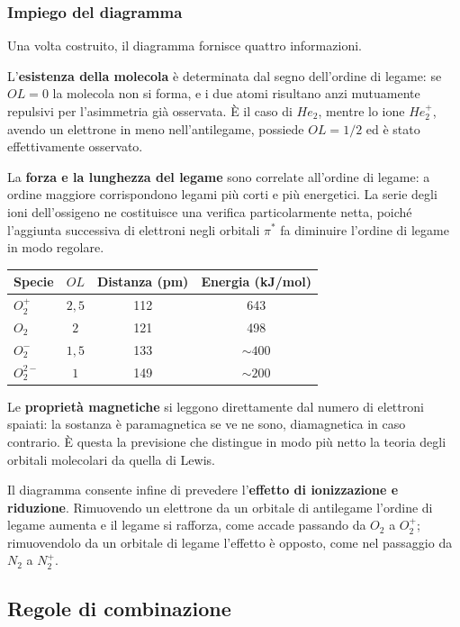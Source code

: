 \subsubsection*{Impiego del diagramma}

Una volta costruito, il diagramma fornisce quattro informazioni.

L'\textbf{esistenza della molecola} è determinata dal segno dell'ordine di legame: se $OL = 0$ la molecola non si forma, e i due atomi risultano anzi mutuamente repulsivi per l'asimmetria già osservata. 
È il caso di $He_2$, mentre lo ione $He_2^+$, avendo un elettrone in meno nell'antilegame, possiede $OL = 1/2$ ed è stato effettivamente osservato.

La \textbf{forza e la lunghezza del legame} sono correlate all'ordine di legame: a ordine maggiore corrispondono legami più corti e più energetici. La serie degli ioni dell'ossigeno ne costituisce una verifica particolarmente netta, poiché l'aggiunta successiva di elettroni negli orbitali $\pi^*$ fa diminuire l'ordine di legame in modo regolare.

\begin{center}
    \begin{tabular}{lccc}
        \toprule
        Specie & $OL$ & Distanza (pm) & Energia (kJ/mol) \\
        \midrule
        $O_2^+$    & $2{,}5$ & 112 & 643 \\
        $O_2$      & $2$     & 121 & 498 \\
        $O_2^-$    & $1{,}5$ & 133 & $\sim 400$ \\
        $O_2^{2-}$ & $1$     & 149 & $\sim 200$ \\
        \bottomrule
    \end{tabular}
\end{center}

Le \textbf{proprietà magnetiche} si leggono direttamente dal numero di elettroni spaiati: la sostanza è paramagnetica se ve ne sono, diamagnetica in caso contrario. 
È questa la previsione che distingue in modo più netto la teoria degli orbitali molecolari da quella di Lewis.

Il diagramma consente infine di prevedere l'\textbf{effetto di ionizzazione e riduzione}. Rimuovendo un elettrone da un orbitale di antilegame l'ordine di legame aumenta e il legame si rafforza, come accade passando da $O_2$ a $O_2^+$; rimuovendolo da un orbitale di legame l'effetto è opposto, come nel passaggio da $N_2$ a $N_2^+$.

\subsection{Regole di combinazione}

